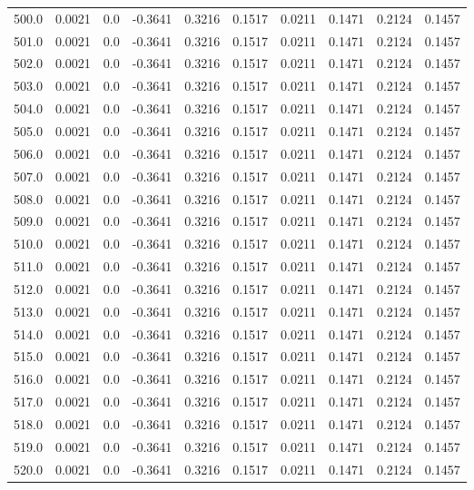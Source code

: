 \begin{longtable}{lrrrrrrrrr}
500.0 & 0.0021 & 0.0 & -0.3641 & 0.3216 & 0.1517 & 0.0211 & 0.1471 & 0.2124 & 0.1457 \\
501.0 & 0.0021 & 0.0 & -0.3641 & 0.3216 & 0.1517 & 0.0211 & 0.1471 & 0.2124 & 0.1457 \\
502.0 & 0.0021 & 0.0 & -0.3641 & 0.3216 & 0.1517 & 0.0211 & 0.1471 & 0.2124 & 0.1457 \\
503.0 & 0.0021 & 0.0 & -0.3641 & 0.3216 & 0.1517 & 0.0211 & 0.1471 & 0.2124 & 0.1457 \\
504.0 & 0.0021 & 0.0 & -0.3641 & 0.3216 & 0.1517 & 0.0211 & 0.1471 & 0.2124 & 0.1457 \\
505.0 & 0.0021 & 0.0 & -0.3641 & 0.3216 & 0.1517 & 0.0211 & 0.1471 & 0.2124 & 0.1457 \\
506.0 & 0.0021 & 0.0 & -0.3641 & 0.3216 & 0.1517 & 0.0211 & 0.1471 & 0.2124 & 0.1457 \\
507.0 & 0.0021 & 0.0 & -0.3641 & 0.3216 & 0.1517 & 0.0211 & 0.1471 & 0.2124 & 0.1457 \\
508.0 & 0.0021 & 0.0 & -0.3641 & 0.3216 & 0.1517 & 0.0211 & 0.1471 & 0.2124 & 0.1457 \\
509.0 & 0.0021 & 0.0 & -0.3641 & 0.3216 & 0.1517 & 0.0211 & 0.1471 & 0.2124 & 0.1457 \\
510.0 & 0.0021 & 0.0 & -0.3641 & 0.3216 & 0.1517 & 0.0211 & 0.1471 & 0.2124 & 0.1457 \\
511.0 & 0.0021 & 0.0 & -0.3641 & 0.3216 & 0.1517 & 0.0211 & 0.1471 & 0.2124 & 0.1457 \\
512.0 & 0.0021 & 0.0 & -0.3641 & 0.3216 & 0.1517 & 0.0211 & 0.1471 & 0.2124 & 0.1457 \\
513.0 & 0.0021 & 0.0 & -0.3641 & 0.3216 & 0.1517 & 0.0211 & 0.1471 & 0.2124 & 0.1457 \\
514.0 & 0.0021 & 0.0 & -0.3641 & 0.3216 & 0.1517 & 0.0211 & 0.1471 & 0.2124 & 0.1457 \\
515.0 & 0.0021 & 0.0 & -0.3641 & 0.3216 & 0.1517 & 0.0211 & 0.1471 & 0.2124 & 0.1457 \\
516.0 & 0.0021 & 0.0 & -0.3641 & 0.3216 & 0.1517 & 0.0211 & 0.1471 & 0.2124 & 0.1457 \\
517.0 & 0.0021 & 0.0 & -0.3641 & 0.3216 & 0.1517 & 0.0211 & 0.1471 & 0.2124 & 0.1457 \\
518.0 & 0.0021 & 0.0 & -0.3641 & 0.3216 & 0.1517 & 0.0211 & 0.1471 & 0.2124 & 0.1457 \\
519.0 & 0.0021 & 0.0 & -0.3641 & 0.3216 & 0.1517 & 0.0211 & 0.1471 & 0.2124 & 0.1457 \\
520.0 & 0.0021 & 0.0 & -0.3641 & 0.3216 & 0.1517 & 0.0211 & 0.1471 & 0.2124 & 0.1457 \\

\end{longtable}
